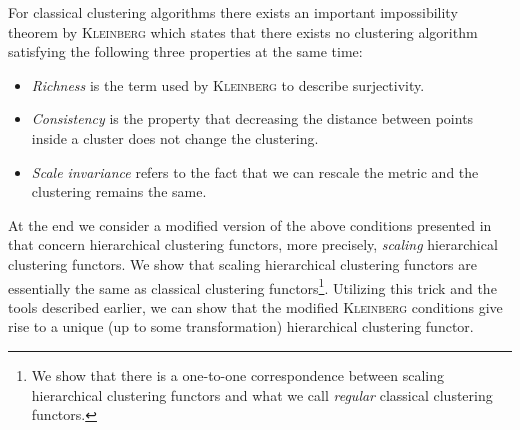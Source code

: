 For classical clustering algorithms there exists an important impossibility theorem by \textsc{Kleinberg} \cite{Kleinberg2002} which states that there exists no clustering algorithm satisfying the following three properties at the same time:

\begin{itemize}
    \item \emph{Richness} is the term used by \textsc{Kleinberg} to describe surjectivity.
    \item  \emph{Consistency} is the property that decreasing the distance between points inside a cluster does not change the clustering.
    \item \emph{Scale invariance} refers to the fact that we can rescale the metric and the clustering remains the same.
\end{itemize}

At the end we consider a modified version of the above conditions presented in \cite[Sec.~7.3.1]{Carlsson2010} that concern hierarchical clustering functors, more precisely, \emph{scaling} hierarchical clustering functors. We show that scaling hierarchical clustering functors are essentially the same as classical clustering functors\footnote{We show that there is a one-to-one correspondence between scaling hierarchical clustering functors and what we call \emph{regular} classical clustering functors.}. Utilizing this trick and the tools described earlier, we can show that the modified \textsc{Kleinberg} conditions give rise to a unique (up to some transformation) hierarchical clustering functor.




